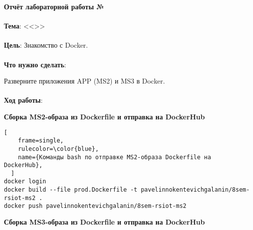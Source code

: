 \documentclass[12pt, a4paper, simple]{eskdtext}
\begin{document}
  

  \begin{center}
    \textbf{Отчёт лабораторной работы №\envReportLabNumber}
  \end{center}

  \paragraph{} \textbf{Тема}: <<\envReportTitle>>

  \paragraph{} \textbf{Цель}:
  Знакомство с Docker.

  \paragraph{} \textbf{Что нужно сделать}:

  Разверните приложения APP (MS2) и MS3 в Docker.


  \paragraph{} \textbf{Ход работы}:

  \begin{center}
    \textbf{Сборка MS2-образа из Dockerfile и отправка на DockerHub}
  \end{center}

  

  \begin{lstlisting}[
    frame=single,
    rulecolor=\color{blue},
    name={Команды bash по отправке MS2-образа Dockerfile на DockerHub},
  ]
docker login
docker build --file prod.Dockerfile -t pavelinnokentevichgalanin/8sem-rsiot-ms2 .
docker push pavelinnokentevichgalanin/8sem-rsiot-ms2
\end{lstlisting}

  \begin{center}
    \textbf{Сборка MS3-образа из Dockerfile и отправка на DockerHub}
  \end{center}

  
\end{document}
